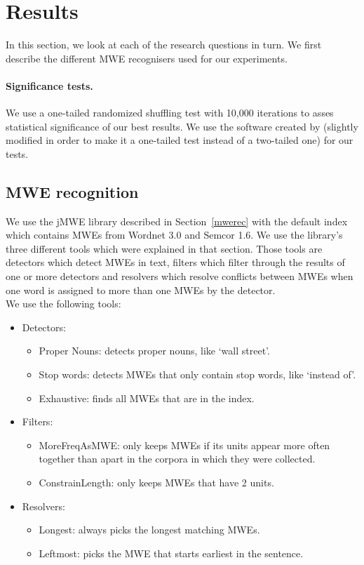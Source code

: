 \documentclass[output=paper]{LSP/langsci}
\begin{document}
\section{Results}
\label{exp}

In this section, we look at each of the research questions in turn. We first describe the different MWE recognisers used for our experiments.
\paragraph*{Significance tests.}
We use a one-tailed randomized shuffling test with 10,000 iterations to asses statistical significance of our best results. We use the software created by \citet{sigf06} (slightly modified in order to make it a one-tailed test instead of a two-tailed one) for our tests.

\subsection{MWE recognition}
\label{expmwerec}
\indent We use the jMWE library described in Section~\ref{mwerec} with the default index which contains MWEs from Wordnet 3.0 and Semcor 1.6. We use the library's three different tools which were explained in that section. Those tools are detectors which detect MWEs in text, filters which filter through the results of one or more detectors and resolvers which resolve conflicts between MWEs when one word is assigned to more than one MWEs by the detector. \\
We use the following tools:
\begin{itemize}
    \item Detectors:
        \begin{itemize}
            \item Proper Nouns: detects proper nouns, like `wall street'.
            \item Stop words: detects MWEs that only contain stop words, like `instead of'.
            \item Exhaustive: finds all MWEs that are in the index.
        \end{itemize}
    \item Filters:
        \begin{itemize}
            \item MoreFreqAsMWE: only keeps MWEs if its units appear more often together than apart in the corpora in which they were collected.
            \item ConstrainLength: only keeps MWEs that have 2 units.
        \end{itemize}
    \item Resolvers:
        \begin{itemize}
            \item Longest: always picks the longest matching MWEs.
            \item Leftmost: picks the MWE that starts earliest in the sentence.
        \end{itemize}
\end{itemize}
\end{document}
